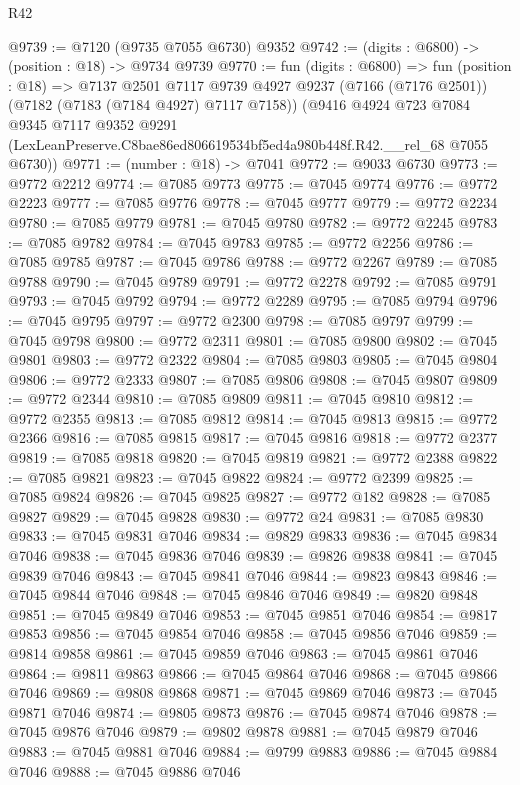 \begin{lexlean}{R42}
\begin{coremodule}
{@9739 := @7120 (@9735 @7055 @6730) @9352
@9742 := (digits : @6800) -> (position : @18) -> @9734 @9739
@9770 := fun (digits : @6800) =>
  fun (position : @18) =>
  @7137
    @2501
    @7117
    @9739
    @4927
    @9237
    (@7166 (@7176 @2501))
    (@7182 (@7183 (@7184 @4927) @7117 @7158))
    (@9416
      @4924
      @723
      @7084
      @9345
      @7117
      @9352
      @9291
      (LexLeanPreserve.C8bae86ed806619534bf5ed4a980b448f.R42.__rel_68 @7055 @6730))
@9771 := (number : @18) -> @7041
@9772 := @9033 @6730
@9773 := @9772 @2212
@9774 := @7085 @9773
@9775 := @7045 @9774
@9776 := @9772 @2223
@9777 := @7085 @9776
@9778 := @7045 @9777
@9779 := @9772 @2234
@9780 := @7085 @9779
@9781 := @7045 @9780
@9782 := @9772 @2245
@9783 := @7085 @9782
@9784 := @7045 @9783
@9785 := @9772 @2256
@9786 := @7085 @9785
@9787 := @7045 @9786
@9788 := @9772 @2267
@9789 := @7085 @9788
@9790 := @7045 @9789
@9791 := @9772 @2278
@9792 := @7085 @9791
@9793 := @7045 @9792
@9794 := @9772 @2289
@9795 := @7085 @9794
@9796 := @7045 @9795
@9797 := @9772 @2300
@9798 := @7085 @9797
@9799 := @7045 @9798
@9800 := @9772 @2311
@9801 := @7085 @9800
@9802 := @7045 @9801
@9803 := @9772 @2322
@9804 := @7085 @9803
@9805 := @7045 @9804
@9806 := @9772 @2333
@9807 := @7085 @9806
@9808 := @7045 @9807
@9809 := @9772 @2344
@9810 := @7085 @9809
@9811 := @7045 @9810
@9812 := @9772 @2355
@9813 := @7085 @9812
@9814 := @7045 @9813
@9815 := @9772 @2366
@9816 := @7085 @9815
@9817 := @7045 @9816
@9818 := @9772 @2377
@9819 := @7085 @9818
@9820 := @7045 @9819
@9821 := @9772 @2388
@9822 := @7085 @9821
@9823 := @7045 @9822
@9824 := @9772 @2399
@9825 := @7085 @9824
@9826 := @7045 @9825
@9827 := @9772 @182
@9828 := @7085 @9827
@9829 := @7045 @9828
@9830 := @9772 @24
@9831 := @7085 @9830
@9833 := @7045 @9831 @7046
@9834 := @9829 @9833
@9836 := @7045 @9834 @7046
@9838 := @7045 @9836 @7046
@9839 := @9826 @9838
@9841 := @7045 @9839 @7046
@9843 := @7045 @9841 @7046
@9844 := @9823 @9843
@9846 := @7045 @9844 @7046
@9848 := @7045 @9846 @7046
@9849 := @9820 @9848
@9851 := @7045 @9849 @7046
@9853 := @7045 @9851 @7046
@9854 := @9817 @9853
@9856 := @7045 @9854 @7046
@9858 := @7045 @9856 @7046
@9859 := @9814 @9858
@9861 := @7045 @9859 @7046
@9863 := @7045 @9861 @7046
@9864 := @9811 @9863
@9866 := @7045 @9864 @7046
@9868 := @7045 @9866 @7046
@9869 := @9808 @9868
@9871 := @7045 @9869 @7046
@9873 := @7045 @9871 @7046
@9874 := @9805 @9873
@9876 := @7045 @9874 @7046
@9878 := @7045 @9876 @7046
@9879 := @9802 @9878
@9881 := @7045 @9879 @7046
@9883 := @7045 @9881 @7046
@9884 := @9799 @9883
@9886 := @7045 @9884 @7046
@9888 := @7045 @9886 @7046
}
\end{coremodule}
\end{lexlean}
